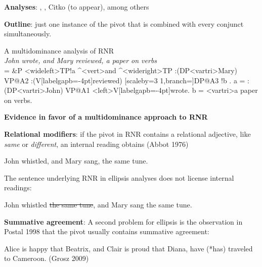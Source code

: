 \documentclass[paper=letter, fontsize=12pt]{scrartcl} %
\numberwithin{equation}{section} %
\numberwithin{figure}{section} %
\numberwithin{table}{section} %
\begin{document}
\textbf{Analyses}: \citealt{McCawley:1982,Wilder:1999,Vos:2005,Gracanin:2007,Johnson:2007,Bachrach:2009,Grosz:2015,Kluck:2009,Vries:2009}, \citealt{Citko:2011}, Citko (to appear), among others


\textbf{Outline}: just one instance of the pivot that is combined with every conjunct simultaneously.

\begin{exe}
\ex A multidominance analysis of RNR \\ \textit{John wrote, and Mary reviewed, a paper on verbs} \\
\jtree[xunit=2.45em,yunit=1.4em,dirA=(1:-1),nodesep=0]
    \def\\{[labelgapb=-4pt]}%
    \def\V{$\rm \overline V$}%
    \! = {\&P}
       <wideleft>{TP}!a ^<vert>{and} ^<wideright>{TP}
       :({DP}<vartri>{Mary}) {VP}@A2
       :({V}\\{reviewed})
       [scaleby=3 1,branch=\blank]{DP}@A3 !b .
     \!a = :({DP}<vartri>{John}) {VP}@A1
       <left>{V}\\{wrote}.
    \!b = <vartri>{a paper on verbs}.
    \endjtree
\end{exe}

\vspace{20pt}
\textbf{Evidence in favor of a multidominance approach to RNR} 

\textbf{Relational modifiers}: if the pivot in RNR contains a relational adjective, like \textit{same} or \textit{different}, an internal reading obtains (Abbot 1976)

\begin{exe}
\ex\label{ellip-int1} John whistled, and Mary sang, the same tune.
\end{exe}

The sentence underlying RNR in ellipsis analyses does not license internal readings:

\begin{exe}
\ex\label{ellip-int2} John whistled \sout{the same tune}, and Mary sang the same tune.
\end{exe} 



\textbf{Summative agreement}: A second problem for ellipsis is the observation in Postal 1998 that the pivot usually contains summative agreement:

\begin{exe}
\ex Alice is happy that Beatrix, and Clair is proud that Diana, have (*has) traveled to Cameroon. (Grosz 2009)
\end{exe}
\end{document}
